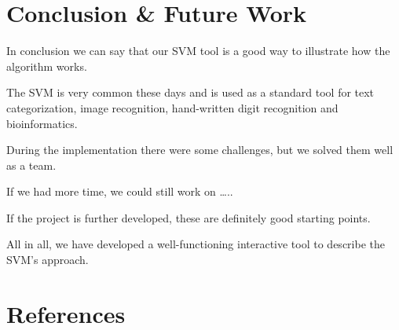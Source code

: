 \documentclass{scrartcl}
\begin{document}
\section{Conclusion \& Future Work}
In conclusion we can say that our SVM tool is a good way to illustrate how the algorithm works. 

The SVM is very common these days and is used as a standard tool for text categorization, image recognition, hand-written digit recognition and bioinformatics. 

During the implementation there were some challenges, but we solved them well as a team.

If we had more time, we could still work on ….. 

If the project is further developed, these are definitely good starting points. 

All in all, we have developed a well-functioning interactive tool to describe the SVM's approach. 

\section{References}
\end{document}
